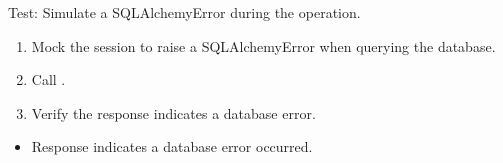 \documentclass[letterpaper,10pt,english]{sphinxmanual}
\begin{document}
\begin{fulllineitems}
\label{\detokenize{test:test.test_room.test_update_room_name_sqlalchemy_error}}
\pysigstartsignatures
\pysiglinewithargsret
{}
{\sphinxparamcomma {}}
{}
\pysigstopsignatures
\sphinxAtStartPar
Test: Simulate a SQLAlchemyError during the operation.
\begin{description}
\begin{enumerate}
%
\item {} 
\sphinxAtStartPar
Mock the session to raise a SQLAlchemyError when querying the database.

\item {} 
\sphinxAtStartPar
Call .

\item {} 
\sphinxAtStartPar
Verify the response indicates a database error.

\end{enumerate}

\begin{itemize}
\item {} 
\sphinxAtStartPar
Response indicates a database error occurred.

\end{itemize}

\end{description}

\end{fulllineitems}

\end{document}
